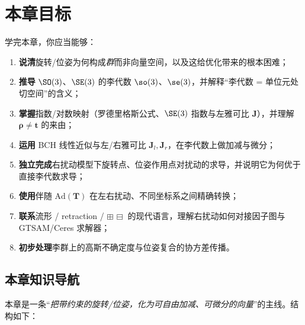 \section*{本章目标}
学完本章，你应当能够：
\begin{enumerate}
  \item \textbf{说清}旋转/位姿为何构成\emph{群}而非向量空间，以及这给优化带来的根本困难；
  \item \textbf{推导} $\SO(3)$、$\SE(3)$ 的李代数 $\so(3)$、$\se(3)$，并解释“李代数 = 单位元处切空间”的含义；
  \item \textbf{掌握}指数/对数映射（罗德里格斯公式、$\SE(3)$ 指数与左雅可比 $\mathbf{J}$），并理解 $\boldsymbol{\rho}\neq\mathbf{t}$ 的来由；
  \item \textbf{运用} BCH 线性近似与左/右雅可比 $\mathbf{J}_l,\mathbf{J}_r$，在李代数上做加减与微分；
  \item \textbf{独立完成}右扰动模型下旋转点、位姿作用点对扰动的求导，并说明它为何优于直接李代数求导；
  \item \textbf{使用}伴随 $\mathrm{Ad}(\mathbf{T})$ 在左右扰动、不同坐标系之间精确转换；
  \item \textbf{联系}流形 / retraction / $\boxplus\,\boxminus$ 的现代语言，理解右扰动如何对接因子图与 GTSAM/Ceres 求解器；
  \item \textbf{初步处理}李群上的高斯不确定度与位姿复合的协方差传播。
\end{enumerate}

\subsection*{本章知识导航}
本章是一条“\emph{把带约束的旋转/位姿，化为可自由加减、可微分的向量}”的主线。结构如下：

